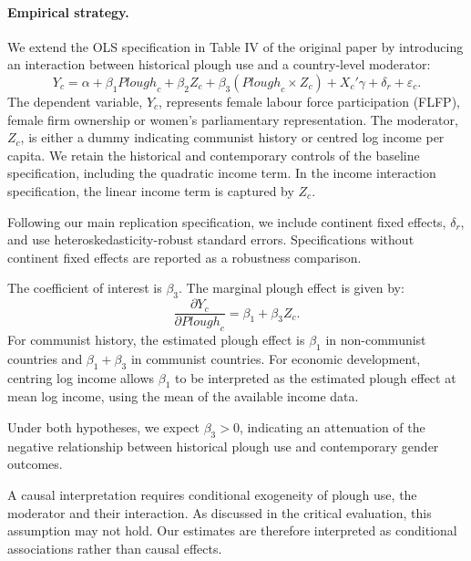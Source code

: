 \documentclass[12pt,a4paper]{article}
\begin{document}
\paragraph{Empirical strategy.}

We extend the OLS specification in Table IV of the original paper by introducing an interaction between historical plough use and a country-level moderator:
\begin{equation}
    Y_c = \alpha + \beta_1 \mathit{Plough}_c + \beta_2 Z_c
    + \beta_3 (\mathit{Plough}_c \times Z_c)
    + X_c'\gamma + \delta_r + \varepsilon_c.
    \label{eq:extension}
\end{equation}
The dependent variable, $Y_c$, represents female labour force participation (FLFP), female firm ownership or women's parliamentary representation. The moderator, $Z_c$, is either a dummy indicating communist history or centred log income per capita. We retain the historical and contemporary controls of the baseline specification, including the quadratic income term. In the income interaction specification, the linear income term is captured by $Z_c$.

Following our main replication specification, we include continent fixed effects, $\delta_r$, and use heteroskedasticity-robust standard errors. Specifications without continent fixed effects are reported as a robustness comparison.

The coefficient of interest is $\beta_3$. The marginal plough effect is given by: 
\begin{equation}
    \frac{\partial Y_c}{\partial \mathit{Plough}_c}
    = \beta_1 + \beta_3 Z_c.
    \label{eq:marginal_effect}
\end{equation}
For communist history, the estimated plough effect is $\beta_1$ in non-communist countries and $\beta_1+\beta_3$ in communist countries. For economic development, centring log income allows $\beta_1$ to be interpreted as the estimated plough effect at mean log income, using the mean of the available income data.

Under both hypotheses, we expect $\beta_3 > 0$, indicating an attenuation of the negative relationship between historical plough use and contemporary gender outcomes.

A causal interpretation requires conditional exogeneity of plough use, the moderator and their interaction. As discussed in the critical evaluation, this assumption may not hold.  Our estimates are therefore interpreted as conditional associations rather than causal effects.
\end{document}

